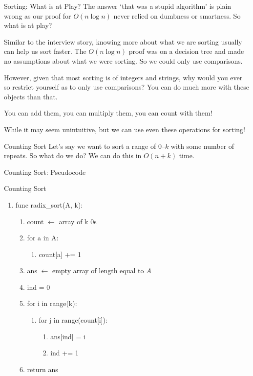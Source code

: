 \documentclass[9pt]{beamer}
\newenvironment{pseudobox}[1]{\begin{exampleblock}{#1}\ttfamily\begin{enumerate}[label=\arabic*.,leftmargin=1.4em,itemsep=0pt]}{\end{enumerate}\end{exampleblock}}
\begin{document}
\begin{frame}{Sorting: What is at Play?}
The answer `that was a stupid algorithm' is plain wrong as our proof for $O(n\log n)$ never relied on dumbness or smartness. So what is at play?

Similar to the interview story, knowing more about what we are sorting usually can help us sort faster. The $O(n\log n)$ proof was on a decision tree and made no assumptions about what we were sorting. So we could only use comparisons.

However, given that most sorting is of integers and strings, why would you ever so restrict yourself as to only use comparisons? You can do much more with these objects than that.

You can add them, you can multiply them, you can count with them!

While it may seem unintuitive, but we can use even these operations for sorting!
\end{frame}

\begin{frame}{Counting Sort}
Let's say we want to sort a range of $0$--$k$ with some number of repeats. So what do we do? We can do this in $O(n+k)$ time.
\end{frame}

\begin{frame}[fragile]{Counting Sort: Pseudocode}
\begin{pseudobox}{Counting Sort}
\item func radix\_sort(A, k):
  \begin{enumerate}[label=\alph*.,leftmargin=1.4em,itemsep=0pt]
  \item count $\leftarrow$ array of k 0s
  \item for a in A:
    \begin{enumerate}[label=\roman*.,leftmargin=1.4em,itemsep=0pt]
    \item count[a] += 1
    \end{enumerate}
  \item ans $\leftarrow$ empty array of length equal to $A$
  \item ind = 0
  \item for i in range(k):
    \begin{enumerate}[label=\roman*.,leftmargin=1.4em,itemsep=0pt]
    \item for j in range(count[i]):
      \begin{enumerate}[label=--,leftmargin=1.4em,itemsep=0pt]
      \item ans[ind] = i
      \item ind += 1
      \end{enumerate}
    \end{enumerate}
  \item return ans
  \end{enumerate}
\end{pseudobox}
\end{frame}
\end{document}
